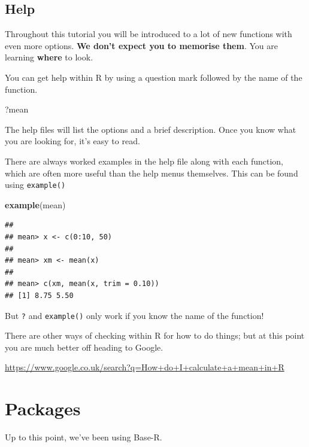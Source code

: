 \documentclass[]{book}
\newenvironment{Shaded}{\begin{snugshade}}{\end{snugshade}}
\newcommand{\KeywordTok}[1]{\textcolor[rgb]{0.13,0.29,0.53}{\textbf{#1}}}
\newcommand{\NormalTok}[1]{#1}
\begin{document}
\hypertarget{help}{%
\subsection{Help}\label{help}}

Throughout this tutorial you will be introduced to a lot of new functions with even more options. \textbf{We don't expect you to memorise them}. You are learning \textbf{where} to look.

You can get help within R by using a question mark followed by the name of the function.

\begin{Shaded}
\begin{Highlighting}[]
\NormalTok{?mean}
\end{Highlighting}
\end{Shaded}

The help files will list the options and a brief description. Once you know what you are looking for, it's easy to read.

There are always worked examples in the help file along with each function, which are often more useful than the help menus themselves. This can be found using \texttt{example()}

\begin{Shaded}
\begin{Highlighting}[]
\KeywordTok{example}\NormalTok{(mean)}
\end{Highlighting}
\end{Shaded}

\begin{verbatim}
## 
## mean> x <- c(0:10, 50)
## 
## mean> xm <- mean(x)
## 
## mean> c(xm, mean(x, trim = 0.10))
## [1] 8.75 5.50
\end{verbatim}

But \texttt{?} and \texttt{example()} only work if you know the name of the function!

There are other ways of checking within R for how to do things; but at this point you are much better off heading to Google.

\url{https://www.google.co.uk/search?q=How+do+I+calculate+a+mean+in+R}

\hypertarget{packages}{%
\section{Packages}\label{packages}}

Up to this point, we've been using Base-R.
\end{document}

